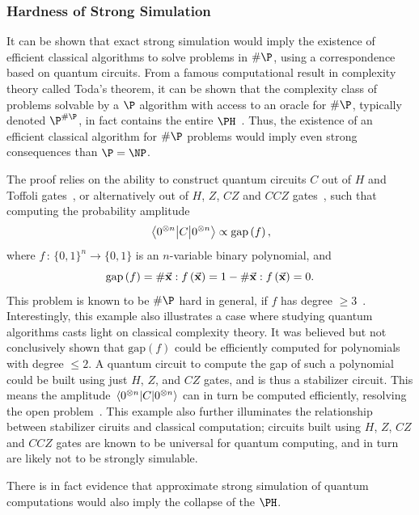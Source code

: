 \subsubsection*{Hardness of Strong Simulation}
It can be shown that exact strong simulation would imply the existence of efficient classical algorithms to solve problems in $\#\P$, using a correspondence based on quantum circuits. From a famous computational result in complexity theory called Toda's theorem, it can be shown that the complexity class of problems solvable by a $\P$ algorithm with access to an oracle for $\#\P$, typically denoted $\P^{\#\P}$, in fact contains the entire $\PH$~\cite{Toda1991}. Thus, the existence of an efficient classical algorithm for $\#\P$ problems would imply even strong consequences than $\P=\NP$.\par
The proof relies on the ability to construct quantum circuits $C$ out of $H$ and Toffoli gates~\cite{Dawson2004}, or alternatively out of $H$, $Z$, $CZ$ and $CCZ$ gates~\cite{Montanaro2017}, such that computing the probability amplitude 
\[\matrixel{0^{\otimes n}}{C}{0^{\otimes n}} \propto \text{gap}\left(f\right),\]
where $f\,:\,\{0,1\}^{n}\rightarrow \{0,1\}$ is an $n$-variable binary polynomial, and
\[\text{gap}\left(f\right) = \# \va{x}:f\left(\va{x}\right)=1 - \# \va{x}:f\left(\va{x}\right)=0.\]
This problem is known to be $\#\P$ hard in general, if $f$ has degree $\geq 3$~\cite{Montanaro2017}. Interestingly, this example also illustrates a case where studying quantum algorithms casts light on classical complexity theory. It was believed but not conclusively shown that $\text{gap}\left(f\right)$ could be efficiently computed for polynomials with degree $\leq 2$. A quantum circuit to compute the gap of such a polynomial could be built using just $H$, $Z$, and $CZ$ gates, and is thus a stabilizer circuit. This means the amplitude $\matrixel{0^{\otimes n}}{C}{0^{\otimes n}}$ can in turn be computed efficiently, resolving the open problem~\cite{Montanaro2017}. This example also further illuminates the relationship between stabilizer ciruits and classical computation; circuits built using $H$, $Z$, $CZ$ and $CCZ$ gates are known to be universal for quantum computing, and in turn are likely not to be strongly simulable.\par
There is in fact evidence that approximate strong simulation of quantum computations would also imply the collapse of the $\PH$.
